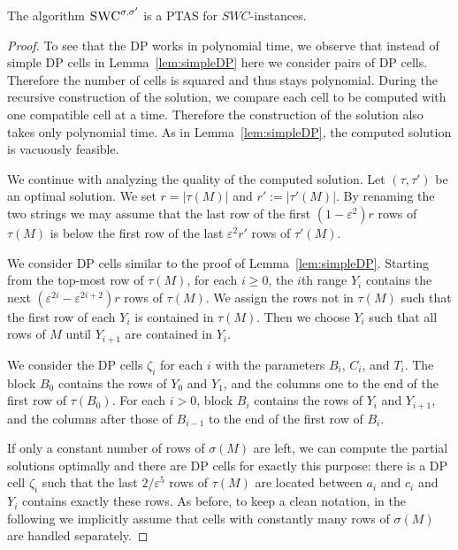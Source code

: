 \begin{theorem}\label{thm:column1}
    The algorithm $\textsc{SWC}^{\sigma,\sigma'}$ is a PTAS for $SWC$-instances.\\
\end{theorem}
\begin{proof}
    To see that the DP works in polynomial time, we observe that instead of simple DP cells in Lemma~\ref{lem:simpleDP} here we consider pairs of DP cells.
    Therefore the number of cells is squared and thus stays polynomial.
    During the recursive construction of the solution, we compare each cell to be computed with one compatible cell at a time.
    Therefore the construction of the solution also takes only polynomial time.
    As in Lemma~\ref{lem:simpleDP}, the computed solution is vacuously feasible.

    We continue with analyzing the quality of the computed solution.
    Let $(\tau,\tau')$ be an optimal solution.
    We set $r = |\tau(M)|$ and $r' := |\tau'(M)|$.
    By renaming the two strings we may assume that the last row of the first $(1-\varepsilon^2) r$ rows of $\tau(M)$ is below the first row of the last $\varepsilon^2 r'$ rows of $\tau'(M)$.

    We consider DP cells similar to the proof of Lemma~\ref{lem:simpleDP}.
    Starting from the top-most row of $\tau(M)$, for each $i \ge 0$, the $i$th range $Y_i$ contains the next 
    $(\varepsilon^{2i} - \varepsilon^{2i+2})r$ rows of $\tau(M)$.
    We assign the rows not in $\tau(M)$ such that the first row of each $Y_i$ is contained in $\tau(M)$.
    Then we choose $Y_i$ such that all rows of $M$ until $Y_{i+1}$ are contained in $Y_i$.

    We consider the DP cells $\zeta_i$ for each $i$ with the parameters $B_i$, $C_i$, and $T_i$.
    The block $B_0$ contains the rows of $Y_0$ and $Y_1$, and the columns one to the end of the first row of $\tau(B_0)$.
    For each $i > 0$, block $B_i$ contains the rows of $Y_i$ and $Y_{i+1}$, and the columns after those of $B_{i-1}$ to the end of the first row of $B_i$.

    If only a constant number of rows of $\sigma(M)$ are left, we can compute the partial solutions optimally and
    there are DP cells for exactly this purpose:
    there is a DP cell $\zeta_i$ such that the last $2/\varepsilon^5$ rows of $\tau(M)$ are located between $a_i$ and $c_i$ and $Y_i$ contains exactly these rows.
    As before, to keep a clean notation, in the following we implicitly assume that cells with constantly many rows of $\sigma(M)$ are handled separately.


\end{proof}
